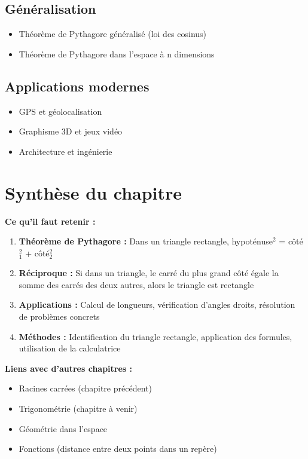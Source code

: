 \subsection{Généralisation}
\begin{itemize}
    \item Théorème de Pythagore généralisé (loi des cosinus)
    \item Théorème de Pythagore dans l'espace à n dimensions
\end{itemize}

\subsection{Applications modernes}
\begin{itemize}
    \item GPS et géolocalisation
    \item Graphisme 3D et jeux vidéo
    \item Architecture et ingénierie
\end{itemize}

\section{Synthèse du chapitre}

\textbf{Ce qu'il faut retenir :}

\begin{enumerate}
    \item \textbf{Théorème de Pythagore :} Dans un triangle rectangle, hypoténuse$^2$ = côté$_1^2$ + côté$_2^2$
    \item \textbf{Réciproque :} Si dans un triangle, le carré du plus grand côté égale la somme des carrés des deux autres, alors le triangle est rectangle
    \item \textbf{Applications :} Calcul de longueurs, vérification d'angles droits, résolution de problèmes concrets
    \item \textbf{Méthodes :} Identification du triangle rectangle, application des formules, utilisation de la calculatrice
\end{enumerate}

\textbf{Liens avec d'autres chapitres :}
\begin{itemize}
    \item Racines carrées (chapitre précédent)
    \item Trigonométrie (chapitre à venir)
    \item Géométrie dans l'espace
    \item Fonctions (distance entre deux points dans un repère)
\end{itemize} 